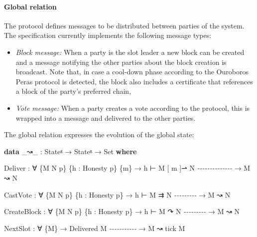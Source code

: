 \documentclass[10pt]{article}
\newenvironment{Shaded}{}{}
\newcommand{\CommentTok}[1]{\textcolor[rgb]{0.38,0.63,0.69}{\textit{#1}}}
\newcommand{\DataTypeTok}[1]{\textcolor[rgb]{0.56,0.13,0.00}{#1}}
\newcommand{\KeywordTok}[1]{\textcolor[rgb]{0.00,0.44,0.13}{\textbf{#1}}}
\newcommand{\NormalTok}[1]{#1}
\newcommand{\OtherTok}[1]{\textcolor[rgb]{0.00,0.44,0.13}{#1}}
\providecommand{\tightlist}{%
  \setlength{\itemsep}{0pt}\setlength{\parskip}{0pt}}
\begin{document}
\paragraph{Global relation}\label{global-relation}

The protocol defines messages to be distributed between parties of the
system. The specification currently implements the following message
types:

\begin{itemize}
\tightlist
\item
  \emph{Block message:} When a party is the slot leader a new block can
  be created and a message notifying the other parties about the block
  creation is broadcast. Note that, in case a cool-down phase according
  to the Ouroboros Peras protocol is detected, the block also includes a
  certificate that references a block of the party's preferred chain,
\item
  \emph{Vote message:} When a party creates a vote according to the
  protocol, this is wrapped into a message and delivered to the other
  parties.
\end{itemize}

The global relation expresses the evolution of the global state:

\begin{Shaded}
\begin{Highlighting}[]
    \KeywordTok{data} \OtherTok{\_}\NormalTok{↝}\OtherTok{\_} \OtherTok{:}\NormalTok{ Stateᵍ }\OtherTok{→}\NormalTok{ Stateᵍ }\OtherTok{→} \DataTypeTok{Set} \KeywordTok{where}

\NormalTok{      Deliver }\OtherTok{:} \OtherTok{∀} \OtherTok{\{}\NormalTok{M N p}\OtherTok{\}} \OtherTok{\{}\NormalTok{h }\OtherTok{:}\NormalTok{ Honesty p}\OtherTok{\}} \OtherTok{\{}\NormalTok{m}\OtherTok{\}}
        \OtherTok{→}\NormalTok{ h ⊢ M [ m ]⇀ N}
          \CommentTok{{-}{-}{-}{-}{-}{-}{-}{-}{-}{-}{-}{-}{-}{-}}
        \OtherTok{→}\NormalTok{ M ↝ N}

\NormalTok{      CastVote }\OtherTok{:} \OtherTok{∀} \OtherTok{\{}\NormalTok{M N p}\OtherTok{\}} \OtherTok{\{}\NormalTok{h }\OtherTok{:}\NormalTok{ Honesty p}\OtherTok{\}}
        \OtherTok{→}\NormalTok{ h ⊢ M ⇉ N}
          \CommentTok{{-}{-}{-}{-}{-}{-}{-}{-}{-}}
        \OtherTok{→}\NormalTok{ M ↝ N}

\NormalTok{      CreateBlock }\OtherTok{:} \OtherTok{∀} \OtherTok{\{}\NormalTok{M N p}\OtherTok{\}} \OtherTok{\{}\NormalTok{h }\OtherTok{:}\NormalTok{ Honesty p}\OtherTok{\}}
        \OtherTok{→}\NormalTok{ h ⊢ M ↷ N}
          \CommentTok{{-}{-}{-}{-}{-}{-}{-}{-}{-}}
        \OtherTok{→}\NormalTok{ M ↝ N}

\NormalTok{      NextSlot }\OtherTok{:} \OtherTok{∀} \OtherTok{\{}\NormalTok{M}\OtherTok{\}}
        \OtherTok{→}\NormalTok{ Delivered M}
          \CommentTok{{-}{-}{-}{-}{-}{-}{-}{-}{-}{-}{-}}
        \OtherTok{→}\NormalTok{ M ↝ tick M}
\end{Highlighting}
\end{Shaded}
\end{document}
